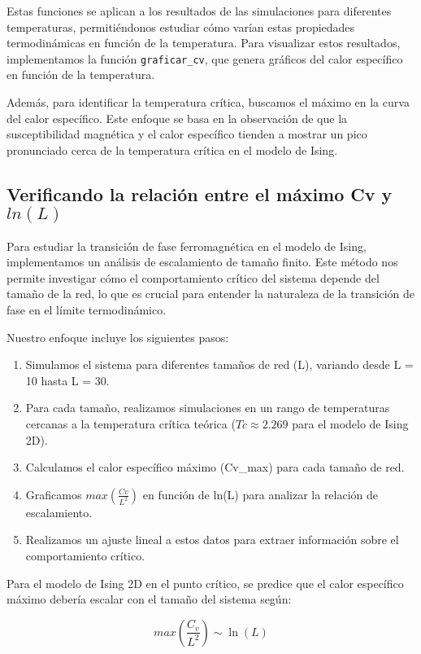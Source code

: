 \documentclass[twocolumn]{article}
\begin{document}
Estas funciones se aplican a los resultados de las simulaciones para diferentes temperaturas, permitiéndonos estudiar cómo varían estas propiedades termodinámicas en función de la temperatura. Para visualizar estos resultados, implementamos la función \texttt{graficar\_cv}, que genera gráficos del calor específico en función de la temperatura.

Además, para identificar la temperatura crítica, buscamos el máximo en la curva del calor específico. Este enfoque se basa en la observación de que la susceptibilidad magnética y el calor específico tienden a mostrar un pico pronunciado cerca de la temperatura crítica en el modelo de Ising.

\subsection*{Verificando la relación entre el máximo Cv y $ln(L)$}

Para estudiar la transición de fase ferromagnética en el modelo de Ising, implementamos un análisis de escalamiento de tamaño finito. Este método nos permite investigar cómo el comportamiento crítico del sistema depende del tamaño de la red, lo que es crucial para entender la naturaleza de la transición de fase en el límite termodinámico.

Nuestro enfoque incluye los siguientes pasos:

\begin{enumerate}
    \item Simulamos el sistema para diferentes tamaños de red (L), variando desde L = 10 hasta L = 30.
    \item Para cada tamaño, realizamos simulaciones en un rango de temperaturas cercanas a la temperatura crítica teórica ($Tc \approx 2.269$ para el modelo de Ising 2D).
    \item Calculamos el calor específico máximo (Cv\_max) para cada tamaño de red.
    \item Graficamos $max(\frac{Cv}{L^2})$ en función de ln(L) para analizar la relación de escalamiento.
    \item Realizamos un ajuste lineal a estos datos para extraer información sobre el comportamiento crítico.
\end{enumerate}

Para el modelo de Ising 2D en el punto crítico, se predice que el calor específico máximo debería escalar con el tamaño del sistema según:

\begin{equation}
    max(\frac{C_v}{L^2}) \sim \ln(L)
\end{equation}
\end{document}
